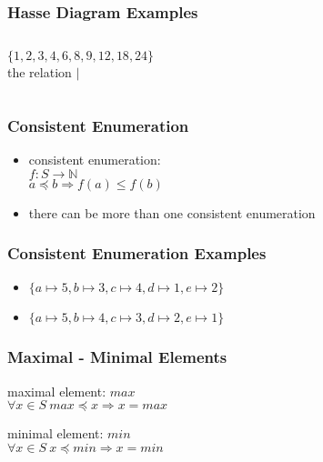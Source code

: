 \documentclass[dvipsnames]{beamer}
\begin{document}
\begin{frame}
  \frametitle{Hasse Diagram Examples}

  \begin{example}
    \begin{columns}
      $\{1,2,3,4,6,8,9,12,18,24\}$\\
      the relation $|$

      \begin{center}
      \end{center}
    \end{columns}
  \end{example}
\end{frame}

\begin{frame}
  \frametitle{Consistent Enumeration}

  \begin{itemize}
    \item consistent enumeration:\\
      $f: S \rightarrow \mathbb{N}$\\
      $a \preceq b \Rightarrow f(a) \leq f(b)$

    \medskip
    \item there can be more than one consistent enumeration
  \end{itemize}
\end{frame}

\begin{frame}
  \frametitle{Consistent Enumeration Examples}

  \begin{example}
    \begin{center}
    \end{center}

    \begin{itemize}
     \item $\{a \longmapsto 5, b \longmapsto 3, c \longmapsto 4,
      d \longmapsto 1, e \longmapsto 2\}$

     \pause
     \item $\{a \longmapsto 5, b \longmapsto 4, c \longmapsto 3,
      d \longmapsto 2, e \longmapsto 1\}$
    \end{itemize}
  \end{example}
\end{frame}

\begin{frame}
  \frametitle{Maximal - Minimal Elements}

  \begin{definition}
    \alert{maximal element}: $max$\\
    $\forall x \in S~max \preceq x \Rightarrow x = max$
  \end{definition}

  \pause
  \begin{definition}
    \alert{minimal element}: $min$\\
    $\forall x \in S~x \preceq min \Rightarrow x = min$
  \end{definition}
\end{frame}
\end{document}

